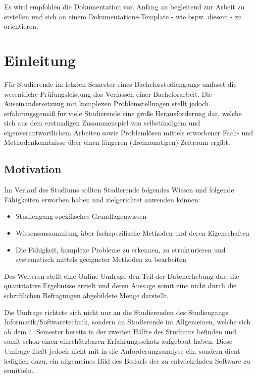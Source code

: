 \documentclass[bibliography=totoc,listof=totoc,BCOR=5mm,DIV=12,oneside]{scrbook}
\begin{document}
Es wird empfohlen die Dokumentation von Anfang an begleitend zur Arbeit zu erstellen und sich an einem Dokumentations-Template - wie bspw. diesem - zu orientieren.

\newpage


\tableofcontents
\newpage
\mainmatter
\pagestyle{plain}

\chapter{Einleitung}
\par Für Studierende im letzten Semester eines Bachelorstudiengangs umfasst die wesentliche Prüfungsleistung das Verfassen einer Bachelorarbeit.
Die Auseinandersetzung mit komplexen Problemstellungen stellt jedoch erfahrungsgemäß für viele Studierende eine große Herausforderung dar, welche sich aus dem erstmaligen Zusammenspiel von selbständigem und eigenverantwortlichem Arbeiten sowie Problemlösen mittels erworbener Fach- und Methodenkenntnisse über einen längeren (dreimonatigen) Zeitraum ergibt.

\section{Motivation}
\par Im Verlauf des Studiums sollten Studierende folgendes Wissen und folgende Fähigkeiten erworben haben und zielgerichtet anwenden können:
\begin{itemize}
\item Studiengang-spezifisches Grundlagenwissen
\item Wissensansammlung über fachspezifische Methoden und deren Eigenschaften
\item Die Fähigkeit, komplexe Probleme zu erkennen, zu strukturieren und systematisch mittels geeigneter Methoden zu bearbeiten
\end{itemize}

\par \bigskip Des Weiteren stellt eine Online-Umfrage den Teil der Datenerhebung dar, die quantitative Ergebnisse erzielt und deren Aussage somit eine nicht durch die schriftlichen Befragungen abgebildete Menge darstellt.
\par Die Umfrage richtete sich nicht nur an die Studierenden des Studiengangs Informatik/Softwaretechnik, sondern an Studierende im Allgemeinen, welche sich ab dem 4. Semester bereits in der zweiten Hälfte des Studiums befinden und somit schon einen einschätzbaren Erfahrungsschatz aufgebaut haben. Diese Umfrage fließt jedoch nicht mit in die Anforderungsanalyse ein, sondern dient lediglich dazu, ein allgemeines Bild des Bedarfs der zu entwickelnden Software zu ermitteln.
\end{document}
